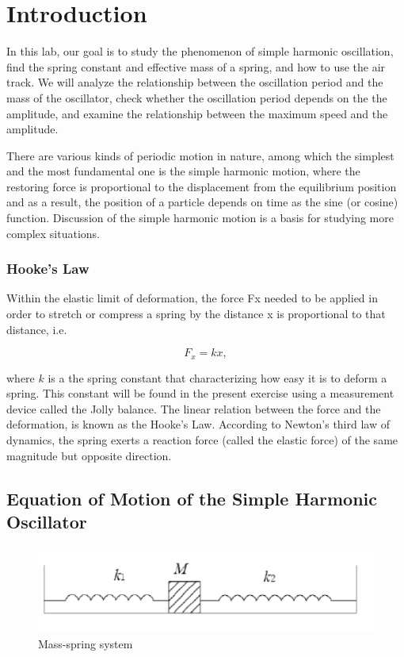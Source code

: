 \section{Introduction}

In this lab, our goal is to study the phenomenon of simple harmonic oscillation,
find the spring constant and effective mass of a spring,
and how to use the air track. We will analyze the relationship between the
oscillation period and the mass of the oscillator, check whether the oscillation
period depends on the the amplitude, and examine the relationship between the
maximum speed and the amplitude. 

There are various kinds of periodic motion in nature, among which the simplest
and the most fundamental one is the simple harmonic motion, where the restoring
force is proportional to the displacement from the equilibrium position and as a
result, the position of a particle depends on time as the sine (or cosine)
function. Discussion of the simple harmonic motion is a basis for studying more
complex situations. 

\subsubsection{Hooke's Law}
Within the elastic limit of deformation, the force Fx needed to be applied in
order to stretch or compress a spring by the distance x is proportional to that
distance, i.e.

\begin{equation}
\label{hookeslaw}
F_x=kx,
\end{equation}

where $k$ is a the spring constant that characterizing how easy it is to deform a
spring.
This constant will be found in the present exercise using a measurement device
called the Jolly balance. 
The linear relation  between the force and the deformation, is known as the
Hooke’s Law.
According to Newton's third law of dynamics, the spring exerts a reaction force
(called the elastic force) of the same magnitude but opposite direction. 

\subsection{Equation of Motion of the Simple Harmonic Oscillator}
\begin{figure}[H]
\centering
\includegraphics[width=12cm]{fig/i1}
\caption{Mass-spring system}
\label{mss}
\end{figure}

